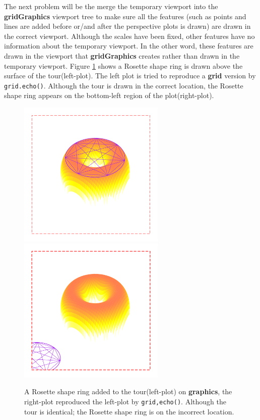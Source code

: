 \documentclass[11pt,twoside]{report}
\begin{document}
The next problem will be the merge the temporary viewport into the \textbf{gridGraphics} viewport tree to make sure all the features (such as points and lines are added before or/and after the perspective plots is drawn) are drawn in the correct viewport. Although the scales have been fixed, other features have no information about the temporary viewport. In the other word, these features are drawn in the viewport that \textbf{gridGraphics} creates rather than drawn in the temporary viewport. Figure \ref{figure_4.4} shows a Rosette shape ring is drawn above the surface of the tour(left-plot). The left plot is tried to reproduce a \textbf{grid} version by \texttt{grid.echo()}. Although the tour is drawn in the correct location, the Rosette shape ring appears on the bottom-left region of the plot(right-plot). \\

\begin{figure}[h]
	\begin{center}
		\includegraphics[height = 7cm, width = 7cm]{figure/gridGraphics_persp_demo_viewport2_1.pdf}
		\includegraphics[height = 7cm, width = 7cm]{figure/gridGraphics_persp_demo_viewport2_2.pdf}
		\caption{A Rosette shape ring added to the tour(left-plot) on \textbf{graphics}, the right-plot reproduced the left-plot by \texttt{grid,echo()}. Although the tour is identical; the Rosette shape ring is on the incorrect location.}
		\label{figure_4.4}
	\end{center}
\end{figure}
\end{document}
